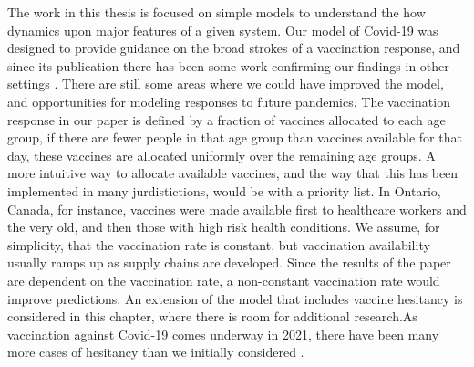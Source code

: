 The work in this thesis is focused on simple models to understand the how dynamics upon major features of a given system. Our model of Covid-19 was designed to provide guidance on the broad strokes of a vaccination response, and since its publication there has been some work confirming our findings in other settings \cite{chen2021age,hogan2021within}. There are still some areas where we could have improved the model, and opportunities for modeling responses to future pandemics. The vaccination response in our paper is defined by a fraction of vaccines allocated to each age group, if there are fewer people in that age group than vaccines available for that day, these vaccines are allocated uniformly over the remaining age groups. A more intuitive way to allocate available vaccines, and the way that this has been implemented in many jurdistictions, would be with a priority list. In Ontario, Canada, for instance, vaccines were made available first to healthcare workers and the very old, and then those with high risk health conditions.  We assume, for simplicity, that the vaccination rate is constant, but vaccination availability usually ramps up as supply chains are developed. Since the results of the paper are dependent on the vaccination rate, a non-constant vaccination rate would improve predictions. An extension of the model that includes vaccine hesitancy is considered in this chapter, where there is room for additional research.As vaccination against Covid-19 comes underway in 2021, there have been many more cases of hesitancy than we initially considered \cite{schwarzinger2021covid,soares2021factors,callaghan2020correlates}. 


